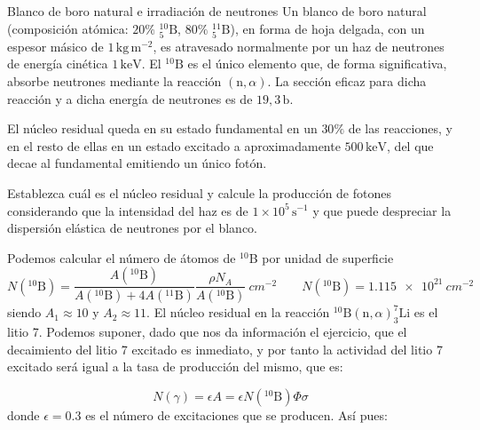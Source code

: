 
\begin{Ejercicio}{Blanco de boro natural e irradiación de neutrones}\label{Ej:08}
Un blanco de boro natural (composición atómica: $20\%$ ${}^{10}_{5}\mathrm{B}$, $80\%$ ${}^{11}_{5}\mathrm{B}$), en forma de hoja delgada, con un espesor másico de $1\,\mathrm{kg\,m^{-2}}$, es atravesado normalmente por un haz de neutrones de energía cinética $1\,\mathrm{keV}$.  
El ${}^{10}\mathrm{B}$ es el único elemento que, de forma significativa, absorbe neutrones mediante la reacción $(\mathrm{n},\alpha)$. La sección eficaz para dicha reacción y a dicha energía de neutrones es de $19{,}3\,\mathrm{b}$.  

El núcleo residual queda en su estado fundamental en un $30\%$ de las reacciones, y en el resto de ellas en un estado excitado a aproximadamente $500\,\mathrm{keV}$, del que decae al fundamental emitiendo un único fotón. 

Establezca cuál es el núcleo residual y calcule la producción de fotones considerando que la intensidad del haz es de $1\times10^{5}\,\mathrm{s^{-1}}$ y que puede despreciar la dispersión elástica de neutrones por el blanco.
\end{Ejercicio}


Podemos calcular el número de átomos de $^{10}$B por unidad de superficie 
\begin{equation}
    N(^{10}\text{B}) = \frac{A(^{10}\text{B})}{A(^{10}\text{B})+4A(^{11}\text{B})} \frac{\rho N_A}{A(^{10}\text{B})} \ \unit{cm^{-2}} \qquad  N(^{10}\text{B}) = \SI{1.115e+21}{cm^{-2}}
\end{equation}
siendo $A_1\approx 10$ y $A_2 \approx 11$. El núcleo residual en la reacción $^{10}\text{B}(\text{n},\alpha)^{7}_{3}\text{Li}$ es el litio 7. Podemos suponer, dado que nos da información el ejercicio, que el decaimiento del litio 7 excitado es inmediato, y por tanto la actividad del litio 7 excitado será igual a la tasa de producción del mismo, que es: 

\begin{equation}
    N(\gamma) = \epsilon A = \epsilon N(^{10}\text{B}) \Phi \sigma
\end{equation}
donde $\epsilon=0.3$ es el número de excitaciones que se producen. Así pues: 

